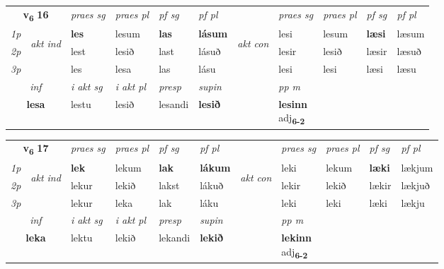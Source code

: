 \noindent
\begin{tabular}{lllllllllll} \toprule
\multicolumn{2}{c}{\textbf{v{\textsubscript{6}}} \Large{\textbf{16}}}  &  \textit{praes sg}  & \textit{praes pl}  &\textit{ pf sg} & \textit{pf pl} &  &  \textit{praes sg}  & \textit{praes pl}  & \textit{pf sg} & \textit{pf pl } \\*
	\cmidrule{3-6} \cmidrule{8-11}
 {\textit{1p}} & \multirow{3}{*}{\begin{turn}{90}\textit{akt ind}\end{turn}} & \textbf{les} & lesum & \textbf{las} & \textbf{lásum} & \multirow{3}{*}{\begin{turn}{90}\textit{akt con}\end{turn}} &lesi & lesum & \textbf{læsi} & læsum\\*
 {\textit{2p}} &  &  lest  & lesið & last & lásuð & & lesir & lesið & læsir & læsuð \\*
{\textit{3p}} &  & les & lesa & las & lásu & & lesi & lesi& læsi & læsu \\*
\cmidrule{3-6} \cmidrule{8-11}

   \multicolumn{2}{c}{\textit{inf}}  & \textit{i akt sg} & \textit{i akt pl}   & \textit{presp} & \textit{supin}  && \textit{pp m} \\*
  \multicolumn{2}{c}{\textbf{lesa}} & lestu  & lesið   & lesandi &  \textbf{lesið}  && \specialcell{\textbf{lesinn} \\ adj\textbf{\textsubscript{6-2}}} \\*
\end{tabular}

\noindent
\begin{tabular}{lllllllllll} \toprule
\multicolumn{2}{c}{\textbf{v{\textsubscript{6}}} \Large{\textbf{17}}}  &  \textit{praes sg}  & \textit{praes pl}  &\textit{ pf sg} & \textit{pf pl} &  &  \textit{praes sg}  & \textit{praes pl}  & \textit{pf sg} & \textit{pf pl } \\*
	\cmidrule{3-6} \cmidrule{8-11}
 {\textit{1p}} & \multirow{3}{*}{\begin{turn}{90}\textit{akt ind}\end{turn}} & \textbf{lek} & lekum & \textbf{lak} & \textbf{lákum} & \multirow{3}{*}{\begin{turn}{90}\textit{akt con}\end{turn}} &leki & lekum & \textbf{læki} & lækjum\\*
 {\textit{2p}} &  &  lekur  & lekið & lakst & lákuð & & lekir & lekið & lækir & lækjuð \\*
{\textit{3p}} &  & lekur & leka & lak & láku & & leki & leki& læki & lækju \\*
\cmidrule{3-6} \cmidrule{8-11}

   \multicolumn{2}{c}{\textit{inf}}  & \textit{i akt sg} & \textit{i akt pl}   & \textit{presp} & \textit{supin}  && \textit{pp m} \\*
  \multicolumn{2}{c}{\textbf{leka}} & lektu  & lekið   & lekandi &  \textbf{lekið}  && \specialcell{\textbf{lekinn} \\ adj\textbf{\textsubscript{6-2}}} \\*
\end{tabular}

